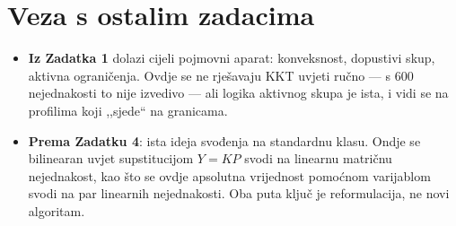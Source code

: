 \section{Veza s ostalim zadacima}
\label{sec:z3o-veze}

\begin{predznanje}
\begin{itemize}[leftmargin=*]
  \item \textbf{Iz Zadatka 1} dolazi cijeli pojmovni aparat: konveksnost,
        dopustivi skup, aktivna ograničenja. Ovdje se ne rješavaju KKT uvjeti
        ručno --- s $600$ nejednakosti to nije izvedivo --- ali logika aktivnog
        skupa je ista, i vidi se na profilima koji ,,sjede`` na granicama.
  \item \textbf{Prema Zadatku 4}: ista ideja svođenja na standardnu klasu.
        Ondje se bilinearan uvjet supstitucijom $Y = KP$ svodi na linearnu
        matričnu nejednakost, kao što se ovdje apsolutna vrijednost pomoćnom
        varijablom svodi na par linearnih nejednakosti. Oba puta ključ je
        reformulacija, ne novi algoritam.
\end{itemize}
\end{predznanje}
